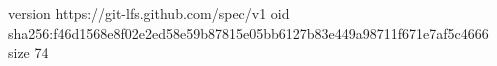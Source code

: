 version https://git-lfs.github.com/spec/v1
oid sha256:f46d1568e8f02e2ed58e59b87815e05bb6127b83e449a98711f671e7af5c4666
size 74
